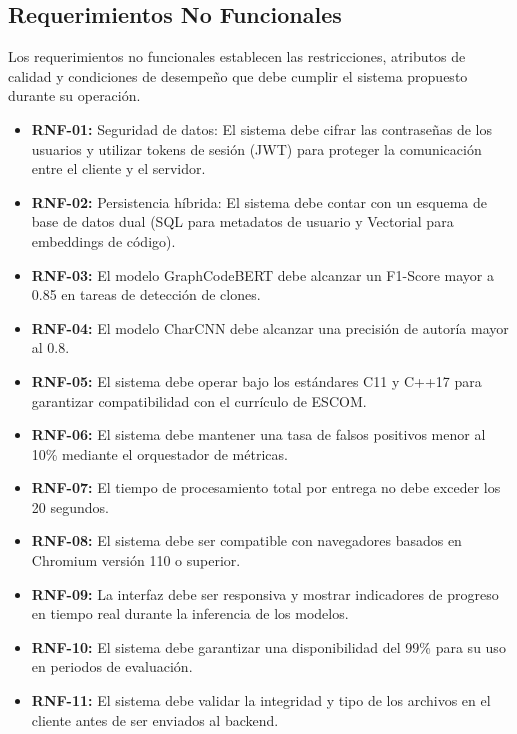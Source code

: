\subsection{Requerimientos No Funcionales}

Los requerimientos no funcionales establecen las restricciones, atributos de calidad y condiciones de desempeño que debe cumplir el sistema propuesto durante su operación.

\begin{itemize}
    \item \textbf{RNF-01:} Seguridad de datos: El sistema debe cifrar las contraseñas de los usuarios y utilizar tokens de sesión (JWT) para proteger la comunicación entre el cliente y el servidor.
    
    \item \textbf{RNF-02:} Persistencia híbrida: El sistema debe contar con un esquema de base de datos dual (SQL para metadatos de usuario y Vectorial para embeddings de código).
    
    \item \textbf{RNF-03:} El modelo GraphCodeBERT debe alcanzar un F1-Score mayor a 0.85 en tareas de detección de clones.
    
    \item \textbf{RNF-04:} El modelo CharCNN debe alcanzar una precisión de autoría mayor al 0.8.
    
    \item \textbf{RNF-05:} El sistema debe operar bajo los estándares C11 y C++17 para garantizar compatibilidad con el currículo de ESCOM.
    
    \item \textbf{RNF-06:} El sistema debe mantener una tasa de falsos positivos menor al 10\% mediante el orquestador de métricas.
    
    \item \textbf{RNF-07:} El tiempo de procesamiento total por entrega no debe exceder los 20 segundos.
    
    \item \textbf{RNF-08:} El sistema debe ser compatible con navegadores basados en Chromium versión 110 o superior.
    
    \item \textbf{RNF-09:} La interfaz debe ser responsiva y mostrar indicadores de progreso en tiempo real durante la inferencia de los modelos.
    
    \item \textbf{RNF-10:} El sistema debe garantizar una disponibilidad del 99\% para su uso en periodos de evaluación.
    
    \item \textbf{RNF-11:} El sistema debe validar la integridad y tipo de los archivos en el cliente antes de ser enviados al backend.
\end{itemize}

